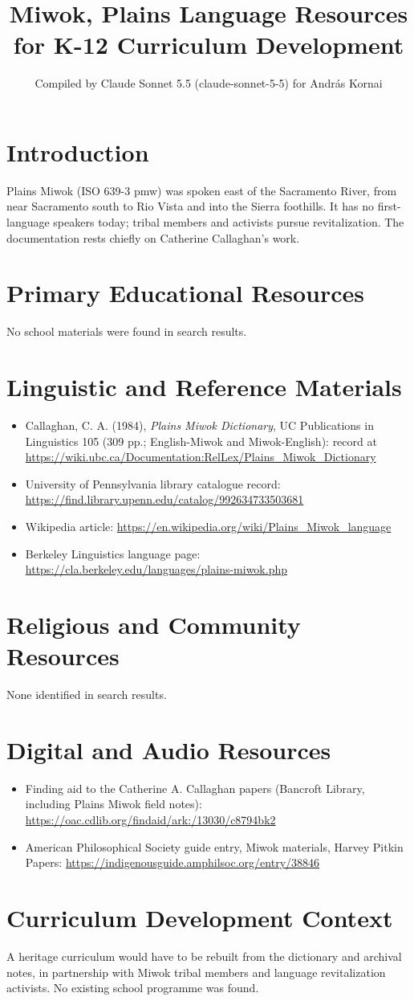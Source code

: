 \documentclass[12pt]{article}
\title{Miwok, Plains Language Resources for K-12 Curriculum Development}
\author{Compiled by Claude Sonnet 5.5 (claude-sonnet-5-5) for Andr\'as Kornai}
\date{}
\begin{document}
\maketitle
\section{Introduction}
Plains Miwok (ISO 639-3 pmw) was spoken east of the Sacramento River, from near Sacramento south to Rio Vista and into the Sierra foothills. It has no first-language speakers today; tribal members and activists pursue revitalization. The documentation rests chiefly on Catherine Callaghan's work.
\section{Primary Educational Resources}
No school materials were found in search results.
\section{Linguistic and Reference Materials}
\begin{itemize}
\item Callaghan, C. A. (1984), \emph{Plains Miwok Dictionary}, UC Publications in Linguistics 105 (309 pp.; English-Miwok and Miwok-English): record at \url{https://wiki.ubc.ca/Documentation:RelLex/Plains_Miwok_Dictionary}
\item University of Pennsylvania library catalogue record: \url{https://find.library.upenn.edu/catalog/992634733503681}
\item Wikipedia article: \url{https://en.wikipedia.org/wiki/Plains_Miwok_language}
\item Berkeley Linguistics language page: \url{https://cla.berkeley.edu/languages/plains-miwok.php}
\end{itemize}
\section{Religious and Community Resources}
None identified in search results.
\section{Digital and Audio Resources}
\begin{itemize}
\item Finding aid to the Catherine A. Callaghan papers (Bancroft Library, including Plains Miwok field notes): \url{https://oac.cdlib.org/findaid/ark:/13030/c8794bk2}
\item American Philosophical Society guide entry, Miwok materials, Harvey Pitkin Papers: \url{https://indigenousguide.amphilsoc.org/entry/38846}
\end{itemize}
\section{Curriculum Development Context}
A heritage curriculum would have to be rebuilt from the dictionary and archival notes, in partnership with Miwok tribal members and language revitalization activists. No existing school programme was found.
\end{document}
